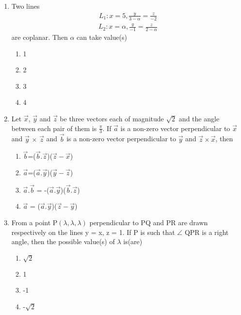 \begin{enumerate}[label=\arabic*.,ref=\thesubsection.\theenumi]
\item Two lines
\begin{align*}
L_1: x = 5, \frac{y}{3 - \alpha} = \frac{z}{-2}
\end{align*}
\begin{align*}
L_2: x = \alpha, \frac{y}{-1} = \frac{z}{2-\alpha}
\end{align*}
are coplanar. Then $\alpha$ can take value(s)
\begin{enumerate}
\item 1
\item 2
\item 3
\item 4
\end{enumerate}

\item Let $\overrightarrow{x}$, $\overrightarrow{y}$ and $\overrightarrow{z}$ be three vectors each of magnitude 
$\sqrt{2}$ and the angle between each pair of them is $\frac{\pi}{3}$. If $\overrightarrow{a}$ is a non-zero vector perpendicular to $\overrightarrow{x}$ and $\overrightarrow{y}$ $\times$ $\overrightarrow{z}$ and $\overrightarrow{b}$ is a non-zero vector perpendicular to $\overrightarrow{y}$ and $\overrightarrow{z} \times \overrightarrow{x}$, then
\begin{enumerate}
\item $\overrightarrow{b}$=($\overrightarrow{b} . \overrightarrow{z}$)($\overrightarrow{z} - \overrightarrow{x}$)
\item $\overrightarrow{a}$=($\overrightarrow{a} . \overrightarrow{y}$)($\overrightarrow{y} - \overrightarrow{z}$)
\item $\overrightarrow{a}$.$\overrightarrow{b}$ = -($\overrightarrow{a} . \overrightarrow{y}$)($\overrightarrow{b} . \overrightarrow{z}$)
\item $\overrightarrow{a}$ = ($\overrightarrow{a} . \overrightarrow{y}$)($\overrightarrow{z} - \overrightarrow{y}$)
\end{enumerate}

\item From a point P$(\lambda, \lambda, \lambda)$ perpendicular to PQ and PR are drawn respectively on the lines y = x, z = 1. If P is such that $\angle$ QPR is a right angle, then the possible value(s) of $\lambda$ is(are)
\begin{enumerate}
\item $\sqrt{2}$
\item 1
\item -1
\item -$\sqrt{2}$
\end{enumerate} 


\end{enumerate}
